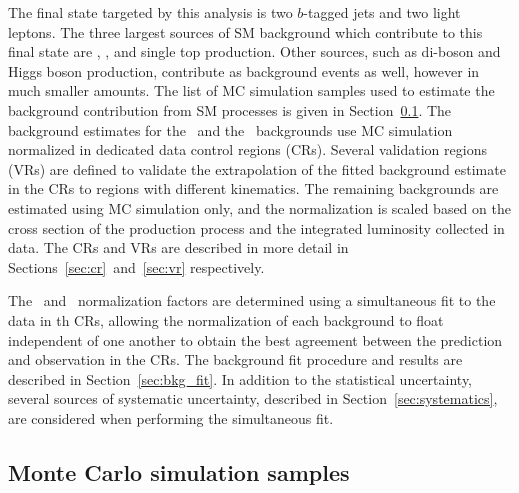 The final state targeted by this analysis is two $b$-tagged jets and two light
leptons.
The three largest sources of SM background which contribute to this final state
are \TTBAR, \ZGAMMAJETS, and single top production.
Other sources, such as di-boson and Higgs boson production, contribute as
background events as well, however in much smaller amounts.
The list of MC simulation samples used to estimate the background contribution
from SM processes is given in Section~\ref{sec:mc_samples}.
The background estimates for the \TTBAR\ and the \ZGAMMAJETS\ backgrounds use
MC simulation normalized in dedicated data control regions (CRs).
Several validation regions (VRs) are defined to validate the extrapolation of
the fitted background estimate in the CRs to regions with different kinematics.
The remaining backgrounds are estimated using MC simulation only, and the
normalization is scaled based on the cross section of the production process and
the integrated luminosity collected in data.
The CRs and VRs are described in more detail in
Sections~\ref{sec:cr}~and~\ref{sec:vr} respectively.

The \TTBAR\ and \ZGAMMAJETS\ normalization factors are determined using a
simultaneous fit to the data in th CRs, allowing the normalization of each
background to float independent of one another to obtain the best agreement
between the prediction and observation in the CRs.
The background fit procedure and results are described in
Section~\ref{sec:bkg_fit}.
In addition to the statistical uncertainty, several sources of systematic
uncertainty, described in Section~\ref{sec:systematics}, are considered when
performing the simultaneous fit.

\subsection{Monte Carlo simulation samples}
\label{sec:mc_samples}

